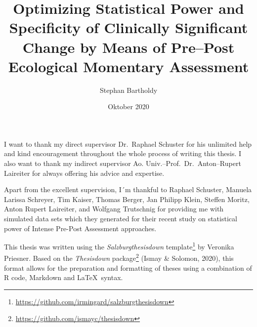 \documentclass[12pt,twoside]{reedthesis}
\title{Optimizing Statistical Power and Specificity of Clinically Significant Change by Means of Pre--Post Ecological Momentary Assessment}
\author{Stephan Bartholdy}
\date{Oktober 2020}
\newcommand\blankpage{%
    \null
    \thispagestyle{empty}%
    \addtocounter{page}{-1}%
    \newpage}
\begin{document}
  \maketitle


\afterpage{\blankpage} %

\frontmatter %
\pagestyle{empty} %
  \begin{acknowledgements}
    I want to thank my direct supervisor Dr.~Raphael Schuster for his unlimited help and kind encouragement throughout the whole process of writing this thesis. I also want to thank my indirect supervisor Ao. Univ.--Prof.~Dr.~Anton--Rupert Laireiter for always offering his advice and expertise.
    
    \par
    
    Apart from the excellent supervision, I´m thankful to Raphael Schuster, Manuela Larissa Schreyer, Tim Kaiser, Thomas Berger, Jan Philipp Klein, Steffen Moritz, Anton Rupert Laireiter, and Wolfgang Trutschnig for providing me with simulated data sets which they generated for their recent study on statistical power of Intense Pre-Post Assessment approaches.
    
    \par
    
    This thesis was written using the \emph{Salzburgthesisdown} template\footnote{\url{https://github.com/irmingard/salzburgthesisdown}} by Veronika Priesner. Based on the \emph{Thesisdown} package\footnote{\url{https://github.com/ismayc/thesisdown}} (Ismay \& Solomon, 2020), this format allows for the preparation and formatting of theses using a combination of R code, Markdown and \LaTeX~syntax.
  \end{acknowledgements}

%
  \hypersetup{linkcolor=black}
  \setcounter{tocdepth}{2}
  \tableofcontents


  \listoftables

\end{document}
